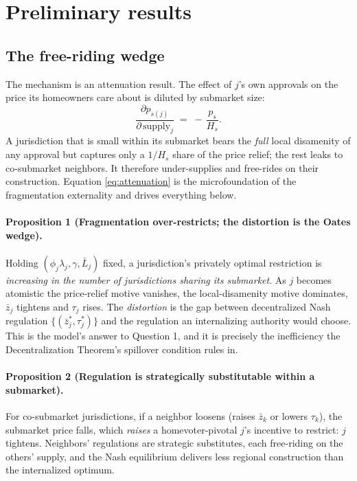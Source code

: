 \documentclass[11pt]{article}
\begin{document}
\section{Preliminary results}

\subsection{The free-riding wedge}

The mechanism is an attenuation result. The effect of $j$'s own approvals on the price its
homeowners care about is diluted by submarket size:
\begin{equation}
  \frac{\partial p_{s(j)}}{\partial\, \text{supply}_j} \;=\; -\,\frac{p_s}{H_s}.
  \label{eq:attenuation}
\end{equation}
A jurisdiction that is small within its submarket bears the \emph{full} local disamenity of any
approval but captures only a $1/H_s$ share of the price relief; the rest leaks to co-submarket
neighbors. It therefore under-supplies and free-rides on their construction. Equation
\eqref{eq:attenuation} is the microfoundation of the fragmentation externality and drives everything
below.

\paragraph{Proposition 1 (Fragmentation over-restricts; the distortion is the Oates wedge).}
Holding $(\phi_j\lambda_j, \gamma, \bar L_j)$ fixed, a jurisdiction's privately optimal restriction
is \emph{increasing in the number of jurisdictions sharing its submarket}. As $j$ becomes atomistic
the price-relief motive vanishes, the local-disamenity motive dominates, $\bar z_j$ tightens and
$\tau_j$ rises. The \emph{distortion} is the gap between decentralized Nash regulation
$\{(\bar z_j^\ast, \tau_j^\ast)\}$ and the regulation an internalizing authority would choose. This
is the model's answer to Question 1, and it is precisely the inefficiency the Decentralization
Theorem's spillover condition rules in.

\paragraph{Proposition 2 (Regulation is strategically substitutable within a submarket).}
For co-submarket jurisdictions, if a neighbor loosens (raises $\bar z_k$ or lowers $\tau_k$), the
submarket price falls, which \emph{raises} a homevoter-pivotal $j$'s incentive to restrict: $j$
tightens. Neighbors' regulations are strategic substitutes, each free-riding on the others' supply,
and the Nash equilibrium delivers less regional construction than the internalized optimum.
\end{document}
